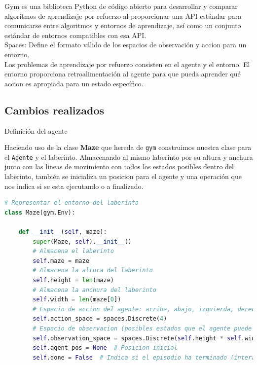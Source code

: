 \documentclass[a4paper,12pt]{article}
\begin{document}
Gym es una biblioteca Python de código abierto para desarrollar y comparar 
algoritmos de aprendizaje por refuerzo al proporcionar una API estándar 
para comunicarse entre algoritmos y entornos de aprendizaje, así como un 
conjunto estándar de entornos compatibles con esa API. \cite{docGym} \\

Spaces: Define el formato válido de los espacios de observación y accion para un entorno.\\

Los problemas de aprendizaje por refuerzo consisten en el agente y 
el entorno. El entorno proporciona retroalimentación al agente para 
que pueda aprender qué accion es apropiada para un estado específico.

\subsection{Cambios realizados}

\begin{center}
    \Large{Definición del agente}
\end{center}

\noindent Haciendo uso de la clase \textbf{Maze} que hereda de \texttt{gym} construimos 
nuestra clase para el \texttt{Agente} y el laberinto. Almacenando al mismo laberinto 
por su altura y anchura junto con las lineas de movimiento con todos los estados posibles 
dentro del laberinto, también se inicializa un posicion para el agente y una operación 
que nos indica si se esta ejecutando o a finalizado.

\begin{lstlisting}[style=mystylepython, language=Python, caption= Definición del agente]
# Representar el entorno del laberinto
class Maze(gym.Env):
    
    def __init__(self, maze):
        super(Maze, self).__init__()
        # Almacena el laberinto
        self.maze = maze  
        # Almacena la altura del laberinto
        self.height = len(maze)  
        # Almacena la anchura del laberinto
        self.width = len(maze[0])  
        # Espacio de accion del agente: arriba, abajo, izquierda, derecha
        self.action_space = spaces.Discrete(4)  
        # Espacio de observacion (posibles estados que el agente puede observar del entorno)
        self.observation_space = spaces.Discrete(self.height * self.width) 
        self.agent_pos = None  # Posicion inicial 
        self.done = False  # Indica si el episodio ha terminado (interacciones entre el agente y el entorno )
\end{lstlisting}
\end{document}
